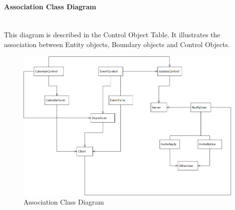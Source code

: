 \newpage
\paragraph{Association Class Diagram}\mbox{}\\

This diagram is described in the Control Object Table. It illustrates the association between Entity objects, Boundary objects and Control Objects.
\begin{figure}[ht!]
\centering
\includegraphics[width=160mm]{Figures/AssociationClassDiagram.png}
\caption{Association Class Diagram \label{overflow}}
\end{figure}